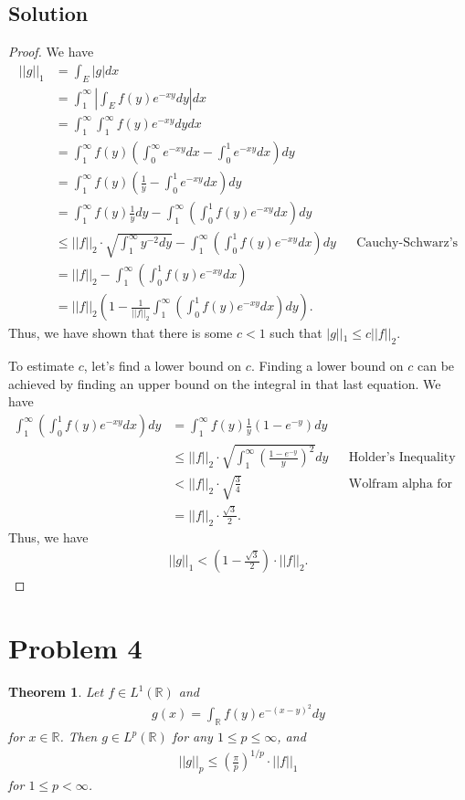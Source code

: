 \documentclass[10pt,a4paper]{article}
\theoremstyle{theorem}
\newtheorem{theorem}{Theorem}
\theoremstyle{definition}
\begin{document}
\subsection*{Solution}
\begin{proof}
We have
\begin{align*}
||g||_1 &= \int_E |g| dx\\
&= \int_1^\infty \left|\int_E f(y) e^{-xy} dy \right| dx\\
&= \int_1^\infty \int_1^\infty f(y) e^{-xy} dy dx\\
&= \int_1^\infty f(y) \left( \int_0^\infty e^{-xy} dx - \int_0^1 e^{-xy} dx\right) dy\\
&= \int_1^\infty f(y) \left(\frac{1}{y} - \int_0^1 e^{-xy} dx\right) dy\\
&= \int_1^\infty f(y)\frac{1}{y} dy - \int_1^\infty \left( \int_0^1 f(y)e^{-xy} dx \right) dy\\
&\leq ||f||_2 \cdot \sqrt{\int_1^\infty y^{-2} dy} - \int_1^\infty \left( \int_0^1 f(y)e^{-xy} dx \right) dy &&\text{Cauchy-Schwarz's}\\
&= ||f||_2 - \int_1^\infty \left( \int_0^1 f(y)e^{-xy} dx \right)\\
&= ||f||_2 \left( 1 - \frac{1}{||f||_2}\int_1^\infty \left( \int_0^1 f(y)e^{-xy} dx \right) dy \right).
\end{align*}
Thus, we have shown that there is some $c < 1$ such that $|g||_1 \leq c ||f||_2$.

To estimate $c$, let's find a lower bound on $c$. Finding a lower bound on $c$ can be achieved by finding an upper bound on the integral in that last equation. We have
\begin{align*}
\int_1^\infty \left( \int_0^1 f(y)e^{-xy} dx \right) dy &= \int_1^\infty f(y)\frac{1}{y}(1 - e^{-y}) dy\\
&\leq ||f||_2 \cdot \sqrt{\int_1^\infty \left(\frac{1 - e^{-y}}{y}\right)^2} dy &&\text{Holder's Inequality}\\
&< ||f||_2 \cdot \sqrt{\frac{3}{4}} &&\text{Wolfram alpha for computing integral}\\
&= ||f||_2 \cdot \frac{\sqrt{3}}{2}.
\end{align*}
Thus, we have
\begin{align*}
||g||_1 < \left(1 - \frac{\sqrt{3}}{2}\right) \cdot ||f||_2.
\end{align*}
\end{proof}

\section*{Problem 4}
\begin{theorem}
Let $f \in L^1(\mathbb{R})$ and 
\begin{align*}
g(x) = \int_\mathbb{R} f(y) e^{-(x - y)^2} dy
\end{align*}
for $x \in \mathbb{R}$. Then $g \in L^p(\mathbb{R})$ for any $1 \leq p \leq \infty$, and
\begin{align*}
||g||_p \leq \left( \frac{\pi}{p} \right)^{1/p} \cdot ||f||_1
\end{align*}
for $1 \leq p < \infty$.
\end{theorem}
\end{document}
